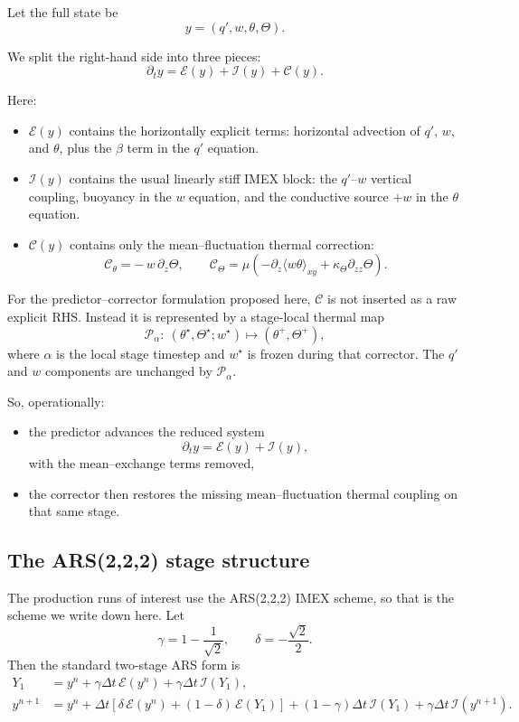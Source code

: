 \documentclass[11pt]{article}
\begin{document}
Let the full state be
\[
y = (q',w,\theta,\Theta).
\]

We split the right-hand side into three pieces:
\[
\partial_t y = \mathcal E(y) + \mathcal I(y) + \mathcal C(y).
\]

Here:
\begin{itemize}
\item $\mathcal E(y)$ contains the horizontally explicit terms:
  horizontal advection of $q'$, $w$, and $\theta$, plus the $\beta$ term in the
  $q'$ equation.
\item $\mathcal I(y)$ contains the usual linearly stiff IMEX block:
  the $q'$--$w$ vertical coupling, buoyancy in the $w$ equation, and the
  conductive source $+w$ in the $\theta$ equation.
\item $\mathcal C(y)$ contains only the mean--fluctuation thermal correction:
  \[
  \mathcal C_\theta = -\,w\,\partial_z \Theta,
  \qquad
  \mathcal C_\Theta = \mu\left(-\partial_z\langle w\theta\rangle_{xy}
  + \kappa_\Theta \partial_{zz}\Theta\right).
  \]
\end{itemize}

For the predictor--corrector formulation proposed here, $\mathcal C$ is not
inserted as a raw explicit RHS. Instead it is represented by a stage-local
thermal map
\[
\mathcal P_\alpha:\ (\theta^\star,\Theta^\star; w^\star)
\mapsto
(\theta^+,\Theta^+),
\]
where $\alpha$ is the local stage timestep and $w^\star$ is frozen during that
corrector. The $q'$ and $w$ components are unchanged by $\mathcal P_\alpha$.

So, operationally:
\begin{itemize}
\item the predictor advances the reduced system
  \[
  \partial_t y = \mathcal E(y) + \mathcal I(y),
  \]
  with the mean--exchange terms removed,
\item the corrector then restores the missing mean--fluctuation thermal
  coupling on that same stage.
\end{itemize}

\subsection{The ARS(2,2,2) stage structure}

The production runs of interest use the ARS(2,2,2) IMEX scheme, so that is the
scheme we write down here. Let
\[
\gamma = 1 - \frac{1}{\sqrt{2}},
\qquad
\delta = -\frac{\sqrt{2}}{2}.
\]
Then the standard two-stage ARS form is
\begin{align}
Y_1 &= y^n + \gamma \Delta t\,\mathcal E(y^n)
      + \gamma \Delta t\,\mathcal I(Y_1),
\label{eq:ars-stage1-standard}
\\
y^{n+1} &= y^n
 + \Delta t\left[\delta\,\mathcal E(y^n) + (1-\delta)\,\mathcal E(Y_1)\right]
 + (1-\gamma)\Delta t\,\mathcal I(Y_1)
 + \gamma \Delta t\,\mathcal I(y^{n+1}).
\label{eq:ars-stage2-standard}
\end{align}
\end{document}
